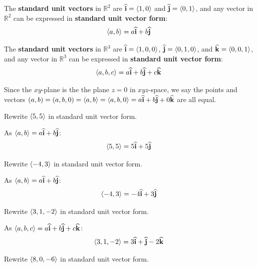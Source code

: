 \documentclass[letterpaper, twoside, 12pt]{book}
\begin{document}
\begin{definition}
The \textbf{standard unit vectors} in $\mathbb{R}^2$ are
$\mathbf{\widehat{i}}=\langle1,0\rangle$ and $\mathbf{\widehat{j}}=\langle0,1\rangle$, and any vector in $\mathbb{R}^2$
can be expressed in \textbf{standard unit vector form}:
  \[\langle a,b\rangle=a\mathbf{\widehat{i}}+b\mathbf{\widehat{j}}\]

The \textbf{standard unit vectors} in $\mathbb{R}^3$ are
$\mathbf{\widehat{i}}=\langle1,0,0\rangle$, $\mathbf{\widehat{j}}=\langle0,1,0\rangle$, and $\mathbf{\widehat{k}}=\langle0,0,1\rangle$, and any vector in
$\mathbb{R}^3$ can be expressed in \textbf{standard unit vector form}:
  \[\langle a,b,c\rangle=a\mathbf{\widehat{i}}+b\mathbf{\widehat{j}}+c\mathbf{\widehat{k}}\]
\end{definition}

\begin{remark}
  Since the $xy$-plane is the the plane $z=0$ in $xyz$-space, we say the
  points and vectors $(a,b)=(a,b,0)=\langle a,b\rangle=\langle a,b,0\rangle=a\mathbf{\widehat{i}}+b\mathbf{\widehat{j}}+0\mathbf{\widehat{k}}$
  are all equal.
\end{remark}



          \begin{problem}
            Rewrite $\langle5,5\rangle$ in standard unit vector form.
          \end{problem}

          \begin{solution}
  As $\langle a,b\rangle=a\mathbf{\widehat{i}}+b\mathbf{\widehat{j}}$:
  \[
    \langle5,5\rangle=5\mathbf{\widehat{i}}+5\mathbf{\widehat{j}}
  \]
          \end{solution}

          \begin{problem}
            Rewrite $\langle-4,3\rangle$ in standard unit vector form.
          \end{problem}

          \begin{solution}
  As $\langle a,b\rangle=a\mathbf{\widehat{i}}+b\mathbf{\widehat{j}}$:
  \[
    \langle-4,3\rangle=-4\mathbf{\widehat{i}}+3\mathbf{\widehat{j}}
  \]
          \end{solution}

          \begin{problem}
            Rewrite $\langle3,1,-2\rangle$ in standard unit vector form.
          \end{problem}

          \begin{solution}
  As $\langle a,b,c\rangle=a\mathbf{\widehat{i}}+b\mathbf{\widehat{j}}+c\mathbf{\widehat{k}}$:
  \[
    \langle3,1,-2\rangle=3\mathbf{\widehat{i}}+\mathbf{\widehat{j}}-2\mathbf{\widehat{k}}
  \]
          \end{solution}

          \begin{problem}
            Rewrite $\langle8,0,-6\rangle$ in standard unit vector form.
          \end{problem}
\end{document}
